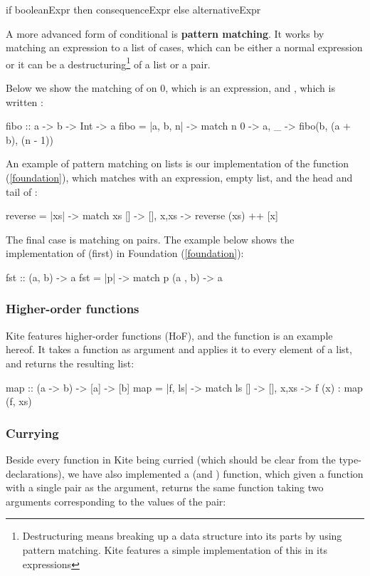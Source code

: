 \begin{kite}
if booleanExpr then consequenceExpr else alternativeExpr
\end{kite}

A more advanced form of conditional is \textbf{pattern matching}. It works by matching an expression to a list of cases, which can be either a normal expression or it can be a destructuring\footnote{Destructuring means breaking up a data structure into its parts by using pattern matching. Kite features a simple implementation of this in its  expressions} of a list or a pair.

Below we show the matching of  on 0, which is an expression, and , which is written :

\begin{kite}
fibo :: a -> b -> Int -> a
fibo = |a, b, n| -> {
  match n {
    0 -> a,
    _ -> fibo(b, (a + b), (n - 1))
  }
}
\end{kite}

An example of pattern matching on lists is our implementation of the function  (\ref{foundation}), which matches  with an expression, empty list, and the head and tail of :

\begin{kite}
reverse = |xs| -> {
  match xs {
    []    -> [],
    x,xs  -> reverse (xs) ++ [x]
  }
}
\end{kite}

The final case is matching on pairs. The example below shows the implementation of  (first) in Foundation (\ref{foundation}):
\begin{kite}
fst :: (a, b) -> a
fst = |p| -> {
  match p {
    (a , b) -> a
  }
}
\end{kite}

\subsubsection{Higher-order functions}
Kite features higher-order functions (HoF), and the  function is an example hereof. It takes a function as argument and applies it to every element of a list, and returns the resulting list:

\begin{kite}
map :: (a -> b) -> [a] -> [b]
map = |f, ls| -> {
  match ls {
    [] -> [],
    x,xs -> f (x) : map (f, xs)
  }
}
\end{kite}

\subsubsection{Currying}
\label{subsubsec:currying}
Beside every function in Kite being curried (which should be clear from the type-declarations), we have also implemented a  (and ) function, which given a function with a single pair as the argument, returns the same function taking two arguments corresponding to the values of the pair:


